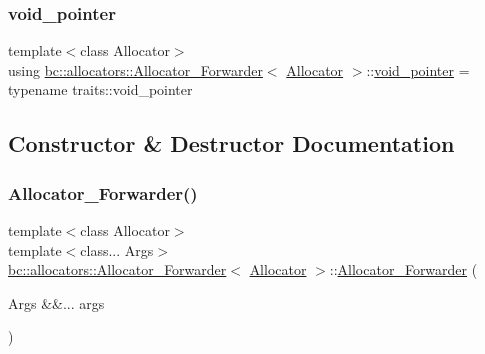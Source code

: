 \subsubsection{\texorpdfstring{void\+\_\+pointer}{void\_pointer}}
{\footnotesize\ttfamily template$<$class Allocator$>$ \\
using \hyperlink{structbc_1_1allocators_1_1Allocator__Forwarder}{bc\+::allocators\+::\+Allocator\+\_\+\+Forwarder}$<$ \hyperlink{classbc_1_1allocators_1_1Allocator}{Allocator} $>$\+::\hyperlink{structbc_1_1allocators_1_1Allocator__Forwarder_a6829b9ef6af37ad340ab8a81745760b8}{void\+\_\+pointer} =  typename traits\+::void\+\_\+pointer}



\subsection{Constructor \& Destructor Documentation}
\mbox{\label{structbc_1_1allocators_1_1Allocator__Forwarder_a2fb4070e5a39213c55350e8f60f02b70}} 
\subsubsection{\texorpdfstring{Allocator\+\_\+\+Forwarder()}{Allocator\_Forwarder()}\hspace{0.1cm}{\footnotesize\ttfamily [1/2]}}
{\footnotesize\ttfamily template$<$class Allocator$>$ \\
template$<$class... Args$>$ \\
\hyperlink{structbc_1_1allocators_1_1Allocator__Forwarder}{bc\+::allocators\+::\+Allocator\+\_\+\+Forwarder}$<$ \hyperlink{classbc_1_1allocators_1_1Allocator}{Allocator} $>$\+::\hyperlink{structbc_1_1allocators_1_1Allocator__Forwarder}{Allocator\+\_\+\+Forwarder} (\begin{DoxyParamCaption}\item[{Args \&\&...}]{args }\end{DoxyParamCaption})\hspace{0.3cm}{\ttfamily [inline]}}

\mbox{\label{structbc_1_1allocators_1_1Allocator__Forwarder_afaf9973cd1c540a087d2867e1761b5f9}} 
